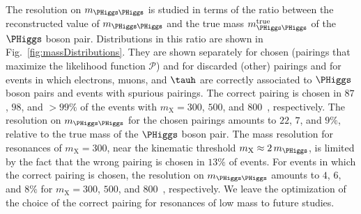 The resolution on $m_{\PHiggs\PHiggs}$ is studied in terms of the ratio between the reconstructed value of $m_{\PHiggs\PHiggs}$ 
and the true mass $m_{\PHiggs\PHiggs}^{\textrm{true}}$ of the $\PHiggs$ boson pair.
Distributions in this ratio are shown in Fig.~\ref{fig:massDistributions}.
They are shown separately for chosen 
(pairings that maximize the likelihood function $\mathcal{P}$) 
and for discarded (other) pairings and for
events in which electrons, muons, and $\tauh$ are correctly associated to $\PHiggs$ boson pairs and events with spurious pairings.
The correct pairing is chosen in $87$, $98$, and $>99\%$ of the events with $m_{\textrm{X}} = 300$, $500$, and $800$~\GeV, respectively.
The resolution on $m_{\PHiggs\PHiggs}$ for the chosen pairings amounts to $22$, $7$, and $9\%$,
relative to the true mass of the $\PHiggs$ boson pair.
The mass resolution for resonances of $m_{\textrm{X}} = 300$, near the kinematic threshold $m_{\textrm{X}} \approx 2 \, m_{\PHiggs}$,
is limited by the fact that the wrong pairing is chosen in $13\%$ of events.
For events in which the correct pairing is chosen, the resolution on $m_{\PHiggs\PHiggs}$ amounts to $4$, $6$, and $8\%$
for $m_{\textrm{X}} = 300$, $500$, and $800$~\GeV, respectively.
We leave the optimization of the choice of the correct pairing for resonances of low mass to future studies.

